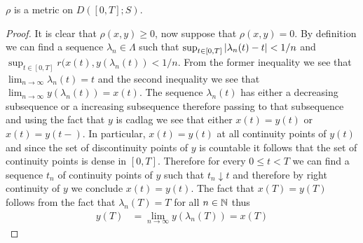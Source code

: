 \begin{lem}\label{SkorohodJ1RhoMetric}$\rho$ is a metric on $D([0,T];S)$.
\end{lem}
\begin{proof}
It is clear that $\rho(x,y) \geq 0$, now suppose that $\rho(x,y) =
0$.  By definition we can find a sequence $\lambda_n \in \Lambda$ such
that $\sup_{t \in [0,T]} \left \vert \lambda_n(t) - t \right \vert < 1/n$ and $\sup_{t
  \in [0,T]} r(x(t), y(\lambda_n(t)) < 1/n$.  From the former
inequality we see that $\lim_{n \to \infty} \lambda_n(t) = t$ and the second
inequality we see that $\lim_{n \to \infty} y(\lambda_n(t)) = x(t)$.
The sequence $\lambda_n(t)$ has either a decreasing subsequence or a increasing subsequence
therefore passing to that subsequence and using the fact that $y$ is cadlag we see that either $x(t) = y(t)$ or $x(t) =
y(t-)$.  In particular, $x(t) = y(t)$ at all continuity points of
$y(t)$ and since the set of discontinuity points of $y$ is countable
it follows that the set of continuity points is dense in $[0,T]$.
Therefore for every $0 \leq t < T$ we can find a sequence $t_n$ of continuity points of $y$
such that $t_n \downarrow t$ and therefore by right continuity
of $y$ we conclude $x(t) = y(t)$.  The fact that $x(T) = y(T)$ follows from
the fact that $\lambda_n(T)=T$ for all $n \in \mathbb{N}$ thus 
\begin{align*}
y(T) &= \lim_{n \to \infty} y(\lambda_n(T)) = x(T)
\end{align*}


\end{proof}
